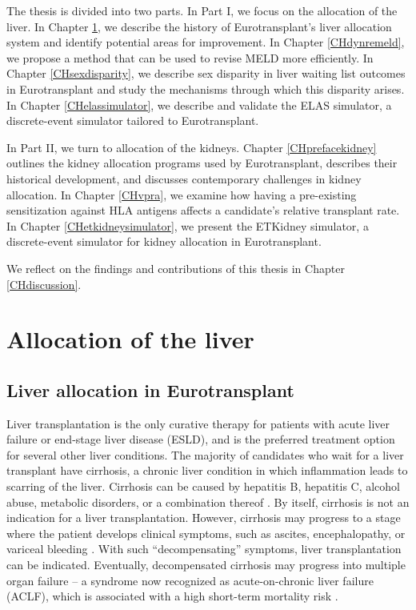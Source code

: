 \documentclass[11pt,twoside,]{book}
\begin{document}
The thesis is divided into two parts. In Part I, we focus on the allocation of the
liver. In Chapter \ref{CHprefaceliver}, we describe the history of
Eurotransplant's liver allocation system and identify potential areas for improvement.
In Chapter \ref{CHdynremeld}, we propose a method that can be used
to revise MELD more efficiently. In Chapter \ref{CHsexdisparity}, we describe
sex disparity in liver waiting list outcomes in Eurotransplant and study the mechanisms
through which this disparity arises. In Chapter \ref{CHelassimulator},
we describe and validate the ELAS simulator, a discrete-event simulator
tailored to Eurotransplant.

In Part II, we turn to allocation of the kidneys. Chapter \ref{CHprefacekidney}
outlines the kidney allocation programs used by Eurotransplant, describes their historical
development, and discusses contemporary challenges in kidney allocation. In Chapter
\ref{CHvpra}, we examine how having a pre-existing sensitization against HLA
antigens affects a candidate's relative transplant rate. In Chapter \ref{CHetkidneysimulator},
we present the ETKidney simulator, a discrete-event simulator for kidney
allocation in Eurotransplant.

We reflect on the findings and contributions of this thesis in Chapter
\ref{CHdiscussion}.

\part{Allocation of the liver}

\chapter{Liver allocation in Eurotransplant}\label{CHprefaceliver}

Liver transplantation is the only curative therapy for patients with acute liver
failure or end-stage liver disease (ESLD), and is the preferred treatment option for
several other liver conditions. The majority of candidates who wait for a liver
transplant have cirrhosis, a chronic liver condition in which inflammation leads
to scarring of the liver. Cirrhosis can be caused by hepatitis B, hepatitis C,
alcohol abuse, metabolic disorders, or a combination thereof \citep{olearyIndicationsLiverTransplantation2008}.
By itself, cirrhosis is not an indication for a liver
transplantation. However, cirrhosis may progress to a stage where the patient
develops clinical symptoms, such as ascites, encephalopathy, or variceal bleeding \citep{olearyIndicationsLiverTransplantation2008}.
With such ``decompensating'' symptoms, liver transplantation can be indicated.
Eventually, decompensated cirrhosis may progress into multiple organ failure
-- a syndrome now recognized as acute-on-chronic liver failure (ACLF),
which is associated with a high short-term mortality risk \citep{Arroyo2020}.
\end{document}
